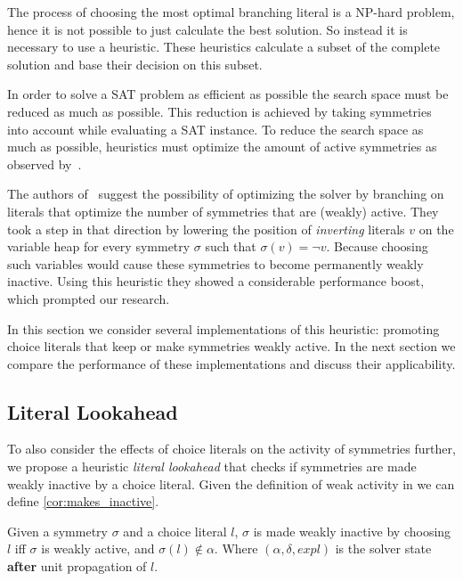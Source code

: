 
The process of choosing the most optimal branching literal is a NP-hard problem, hence it is not possible to 
just calculate the best solution. So instead it is necessary to use a heuristic.
These heuristics calculate a subset of the complete solution and base their decision on this subset.

In order to solve a SAT problem as efficient as possible the search space must be reduced as much as possible.
This reduction is achieved by taking symmetries into account while evaluating a SAT instance.
To reduce the search space as much as possible, heuristics must optimize the amount of active symmetries as observed by~\cite{devriendt2012symmetry}.

The authors of~\cite{devriendt2012symmetry} suggest the possibility of optimizing the solver by
branching on literals that optimize the number of symmetries that are (weakly) active.
They took a step in that direction by lowering the position of \emph{inverting} literals $v$ on the variable heap for
every symmetry $\sigma$ such that $\sigma(v) = \neg v$.
Because choosing such variables would cause these symmetries to become permanently weakly inactive.
Using this heuristic they showed a considerable performance boost, which prompted our research.

In this section we consider several implementations of this heuristic: promoting choice literals
that keep or make symmetries weakly active.
In the next section we compare the performance of these implementations and discuss their
applicability.

\subsection{Literal Lookahead}
	To also consider the effects of choice literals on the activity of symmetries further,
	we propose a heuristic \emph{literal lookahead} that checks if symmetries are made weakly inactive by a choice literal.
	Given the definition of weak activity in \cite{devriendt2012symmetry} we can define \cref{cor:makes_inactive}.\\

	\begin{corollary}
		\label{cor:makes_inactive}
		Given a symmetry $\sigma$ and a choice literal $l$,
		$\sigma$ is made weakly inactive by choosing $l$ iff
		$\sigma$ is weakly active, and $\sigma(l) \notin \alpha$.
		Where $(\alpha,\delta,\textit{expl})$ is the solver state \textbf{after} unit propagation of $l$. 
	\end{corollary}

